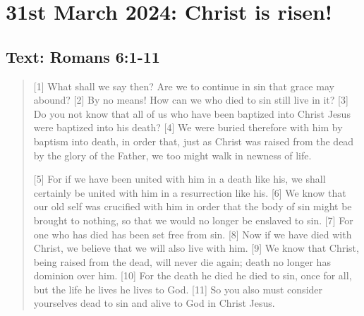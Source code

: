 \setcounter{figure}{0}

\section{31st March 2024: Christ is risen!}
\subsection*{Text: Romans 6:1-11}
  \begin{quote}
    [1] What shall we say then? Are we to continue in sin that grace may abound? [2] By no means! How can we who died to sin still live in it? [3] Do you not know that all of us who have been baptized into Christ Jesus were baptized into his death? [4] We were buried therefore with him by baptism into death, in order that, just as Christ was raised from the dead by the glory of the Father, we too might walk in newness of life.

    [5] For if we have been united with him in a death like his, we shall certainly be united with him in a resurrection like his. [6] We know that our old self was crucified with him in order that the body of sin might be brought to nothing, so that we would no longer be enslaved to sin. [7] For one who has died has been set free from sin. [8] Now if we have died with Christ, we believe that we will also live with him. [9] We know that Christ, being raised from the dead, will never die again; death no longer has dominion over him. [10] For the death he died he died to sin, once for all, but the life he lives he lives to God. [11] So you also must consider yourselves dead to sin and alive to God in Christ Jesus.
  \end{quote}
